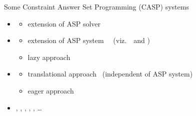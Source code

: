 \begin{frame}{Some Constraint Answer Set Programming (CASP) systems}
  \bigskip
  \begin{itemize}
  \item<1-> \alert{\adsolver}
    \begin{itemize}
    \item<1-> extension of ASP solver \smodels
    \end{itemize}
    \bigskip
  \item<2-> \alert{\clingcon}
    \begin{itemize}
    \item<2-> extension of ASP system \clingo\ \ (viz.\ \gringo\ and \clasp)
    \item<2-> lazy approach
    \end{itemize}
  \item<3-> \alert{\aspartame}
    \begin{itemize}
    \item<3-> translational approach \ (independent of ASP system)
    \item<2-> eager approach
    \end{itemize}
    \bigskip
  \item<4->
    \alert{\aspmt},
    \alert{\dlvhex},
    \alert{\ezcsp},
    \alert{\gasp},
    \alert{\inca},
    \dots
  \end{itemize}
\end{frame}
